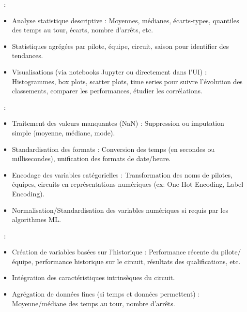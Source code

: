 \documentclass[11pt, a4paper]{article}
\begin{document}
\begin{description}[style=standard, itemsep=0.5em, labelwidth=!, leftmargin=1.5em, font=\normalfont]
    \item[Analyse Exploratoire des Données (EDA)]~:
        \begin{itemize}[label=\textbullet, itemsep=0.2em, leftmargin=*]
            \item Analyse statistique descriptive : Moyennes, médianes, écarts-types, quantiles des temps au tour, écarts, nombre d'arrêts, etc.
            \item Statistiques agrégées par pilote, équipe, circuit, saison pour identifier des tendances.
            \item Visualisations (via notebooks Jupyter ou directement dans l'UI) : Histogrammes, box plots, scatter plots, time series pour suivre l'évolution des classements, comparer les performances, étudier les corrélations.
        \end{itemize}
    \item[Nettoyage et Prétraitement]~:
        \begin{itemize}[label=\textbullet, itemsep=0.2em, leftmargin=*]
            \item Traitement des valeurs manquantes (NaN) : Suppression ou imputation simple (moyenne, médiane, mode).
            \item Standardisation des formats : Conversion des temps (en secondes ou millisecondes), unification des formats de date/heure.
            \item Encodage des variables catégorielles : Transformation des noms de pilotes, équipes, circuits en représentations numériques (ex: One-Hot Encoding, Label Encoding).
            \item Normalisation/Standardisation des variables numériques si requis par les algorithmes ML.
        \end{itemize}
    \item[Ingénierie de Caractéristiques (Feature Engineering)]~:
        \begin{itemize}[label=\textbullet, itemsep=0.2em, leftmargin=*]
            \item Création de variables basées sur l'historique : Performance récente du pilote/équipe, performance historique sur le circuit, résultats des qualifications, etc.
            \item Intégration des caractéristiques intrinsèques du circuit.
            \item Agrégation de données fines (si temps et données permettent) : Moyenne/médiane des temps au tour, nombre d'arrêts.

\end{itemize}
\end{description}
\end{document}
